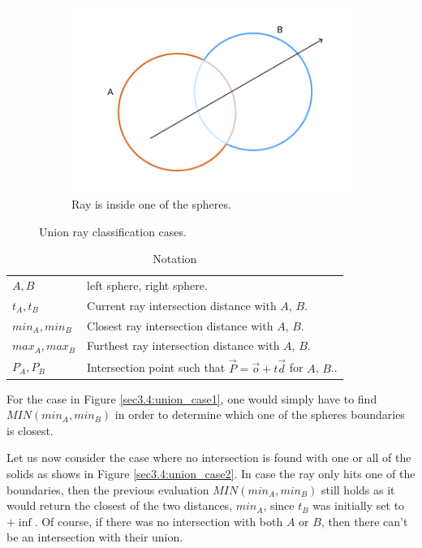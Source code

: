 \documentclass[a4paper,11pt,oneside]{article}
\begin{document}
\begin{figure}[ht]
\begin{subfigure}[b]{0.3\textwidth}
         \includegraphics[width=\textwidth]{section3/3.4/sphere_union_case3.png}
         \caption{Ray is inside one of the spheres.}
         \label{sec3.4:union_case3}
     \end{subfigure}
        \caption{Union ray classification cases.}
        \label{sec3.4:sphere_union}
\end{figure}

\begin{table}
	\caption{Notation}
	\label{table:notations2}
	\begin{tabularx}{\textwidth}{p{}X}
		\toprule
		$A, B$									     & left sphere, right sphere. 						   \\
		$t_A, t_B$                                   & Current ray intersection distance with $A$, $B$.   \\
		$min_A, min_B$                               & Closest ray intersection distance with $A$, $B$.   \\
		$max_A, max_B$                               & Furthest ray intersection distance with $A$, $B$.  \\
		$P_A, P_B$                                   & Intersection point such that $\vec{P} = \vec{o} + t\vec{d}$ for $A$, $B$.. \\
		\bottomrule
	\end{tabularx}
\end{table}

For the case in Figure \ref{sec3.4:union_case1}, one would simply have to find $MIN(min_A, min_B)$ in order to determine which one of the spheres boundaries is closest.

Let us now consider the case where no intersection is found with one or all of the solids as shows in Figure \ref{sec3.4:union_case2}. In case the ray only hits one of the boundaries, then the previous evaluation $MIN(min_A, min_B)$ still holds as it would return the closest of the two distances, $min_A$, since $t_B$ was initially set to $+\inf$. Of course, if there was no intersection with both $A$ or $B$, then there can't be an intersection with their union.
\end{document}
